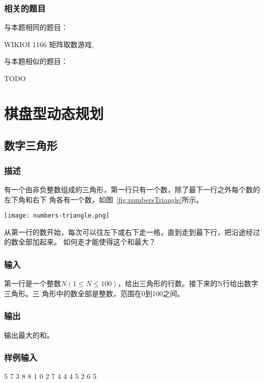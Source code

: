 \subsubsection{相关的题目}
与本题相同的题目：
\begindot
\item WIKIOI 1166 矩阵取数游戏, 
\myenddot

与本题相似的题目：
\begindot
\item TODO
\myenddot


\section{棋盘型动态规划} %

\subsection{数字三角形}

\subsubsection{描述}
有一个由非负整数组成的三角形，第一行只有一个数，除了最下一行之外每个数的左下角和右下
角各有一个数，如图~\ref{fig:numbersTriangle}所示。

\begin{center}
\texttt{[image: numbers-triangle.png]}\\
\label{fig:numbersTriangle}
\end{center}

从第一行的数开始，每次可以往左下或右下走一格，直到走到最下行，把沿途经过的数全部加起来。
如何走才能使得这个和最大？

\subsubsection{输入}
第一行是一个整数$N (1 \le N \leq 100)$，给出三角形的行数。接下来的N行给出数字三角形。三
角形中的数全部是整数，范围在0到100之间。

\subsubsection{输出}
输出最大的和。

\subsubsection{样例输入}
\begin{Code}
5
7
3 8 
8 1 0  
2 7 4 4 
4 5 2 6 5
\end{Code}

